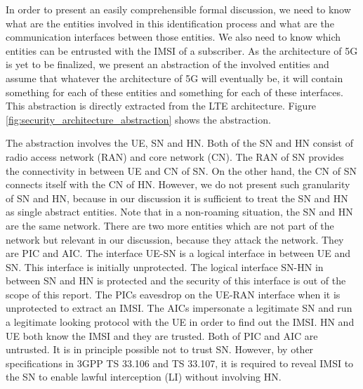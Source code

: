\documentclass[12pt]{llncs}
\begin{document}
In order to present an easily comprehensible formal discussion, we need to know what are the entities involved in this identification process and what are the communication interfaces between those entities. We also need to know which entities can be entrusted with the IMSI of a subscriber. As the architecture of 5G is yet to be finalized, we present an abstraction of the involved entities and assume that whatever the architecture of 5G will eventually be, it will contain something for each of these entities and something for each of these interfaces. This abstraction is directly extracted from the LTE architecture. Figure \ref{fig:security_architecture_abstraction} shows the abstraction.

The abstraction involves the UE, SN and HN. Both of the SN and HN consist of radio access network (RAN) and core network (CN). The RAN of SN provides the connectivity in between UE and CN of SN. On the other hand, the CN of SN connects itself with the CN of HN. However, we do not present such granularity of SN and HN, because in our discussion it is sufficient to treat the SN and HN as single abstract entities. Note that in a non-roaming situation, the SN and HN are the same network. There are two more entities which are not part of the network but relevant in our discussion, because they attack the network. They are PIC and AIC. The interface UE-SN is a logical interface in between UE and SN. This interface is initially unprotected. The logical interface SN-HN in between SN and HN is protected and the security of this interface is out of the scope of this report. The PICs eavesdrop on the UE-RAN interface when it is unprotected to extract an IMSI. The AICs impersonate a legitimate SN and run a legitimate looking protocol with the UE in order to find out the IMSI. HN and UE both know the IMSI and they are trusted. Both of PIC and AIC are untrusted. It is in principle possible not to trust SN. However, by other specifications in 3GPP TS 33.106 and TS 33.107, it is required to reveal IMSI to the SN to enable lawful interception (LI) without involving HN.
\end{document}
